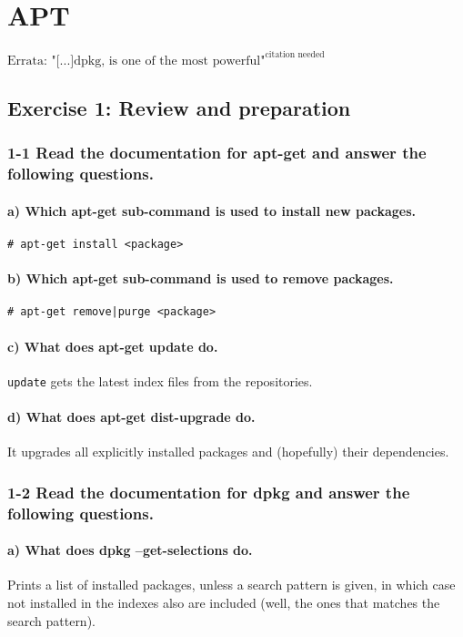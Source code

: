 
\chapter{APT}
$\text{Errata: "[...]dpkg, is one of the most powerful"}^{\text{citation needed}}$
\section{Exercise 1: Review and preparation}
\subsection{1-1 Read the documentation for apt-get and answer the following questions.}
\subsubsection{a) Which apt-get sub-command is used to install new packages.}
\verb=# apt-get install <package>=

\subsubsection{b) Which apt-get sub-command is used to remove packages.}
\verb=# apt-get remove|purge <package>=

\subsubsection{c) What does apt-get update do.}
\verb=update= gets the latest index files from the repositories.

\subsubsection{d) What does apt-get dist-upgrade do.}
It upgrades all explicitly installed packages and (hopefully) their dependencies.

\subsection{1-2 Read the documentation for dpkg and answer the following questions.}
\subsubsection{a) What does dpkg --get-selections do.}
Prints a list of installed packages, unless a search pattern is given, in which case not installed in the indexes also are included (well, the ones that matches the search pattern).

